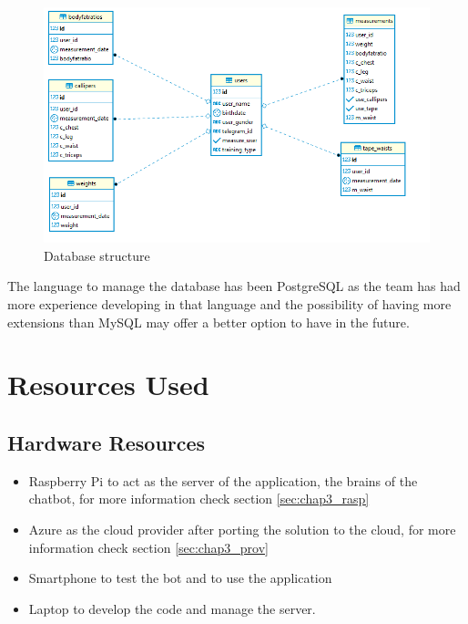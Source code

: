 \begin{center}
	\begin{figure}[h!]
		\centering
		\includegraphics[scale=0.7]{./images/4-database-structure}
		\caption{Database structure}
		\label{4_database_structure}
	\end{figure}
\end{center}

The language to manage the database has been PostgreSQL as the team has had more experience developing in that language and the possibility of having more extensions than MySQL may offer a better option to have in the future.

\section{Resources Used}\label{sec:chap4_res_used}

\subsection{Hardware Resources}\label{sec:chap4_hard_res}

\begin{itemize}
	\item{Raspberry Pi to act as the server of the application, the brains of the chatbot, for more information check section \ref{sec:chap3_rasp}}
	\item{Azure as the cloud provider after porting the solution to the cloud, for more information check section \ref{sec:chap3_prov}}
	\item{Smartphone to test the bot and to use the application}
	\item{Laptop to develop the code and manage the server.}
\end{itemize}


